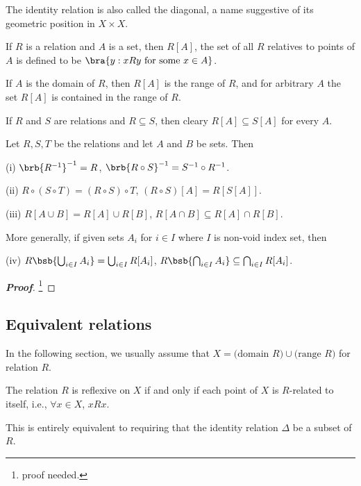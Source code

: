 \begin{remark}
The identity relation is also called the diagonal, a name suggestive of its geometric position in $X\times X$.
\end{remark}


\begin{definition}
If $R$ is a relation and $A$ is a set, then $R[A]$, the set of all $R$ relatives to points of $A$ is defined to be $\bra{y:xRy \text{ for some }x\in A}$.
\end{definition}

\begin{remark}
If $A$ is the domain of $R$, then $R[A]$ is the range of $R$, and for arbitrary $A$ the set $R[A]$ is contained in the range of $R$.

If $R$ and $S$ are relations and $R\subseteq S$, then cleary $R[A] \subseteq S[A]$ for every $A$.
\end{remark}


\begin{proposition}\label{pro:inverse_relation_properties}
Let $R,S,T$ be the relations and let $A$ and $B$ be sets. Then
\ben
\item [(i)] $\brb{R^{-1}}^{-1} = R$, $\brb{R\circ S}^{-1} = S^{-1}\circ R^{-1}$.
\item [(ii)] $R\circ (S\circ T) = (R\circ S)\circ T$, $(R\circ S)[A] = R[S[A]]$.
\item [(iii)] $R[A\cup B] = R[A] \cup R[B]$, $R[A\cap B] \subseteq R[A] \cap R[B]$.
\een

More generally, if given sets $A_i$ for $i\in I$ where $I$ is non-void index set, then
\ben
\item [(iv)] $R\bsb{\bigcup_{i\in I}A_i} = \bigcup_{i\in I} R[A_i]$, $R\bsb{\bigcap_{i\in I}A_i} \subseteq \bigcap_{i\in I} R[A_i]$.
\een
\end{proposition}

\begin{proof}[\bf Proof]
\footnote{proof needed.}
\end{proof}

\subsection{Equivalent relations}

In the following section, we usually assume that $X = \text{(domain $R$)}\cup \text{(range $R$)}$ for relation $R$.

\begin{definition}
The relation $R$ is reflexive on $X$ if and only if each point of $X$ is $R$-related to itself, i.e., $\forall x\in X$, $xRx$.

This is entirely equivalent to requiring that the identity relation $\Delta$ be a subset of $R$.
\end{definition}

